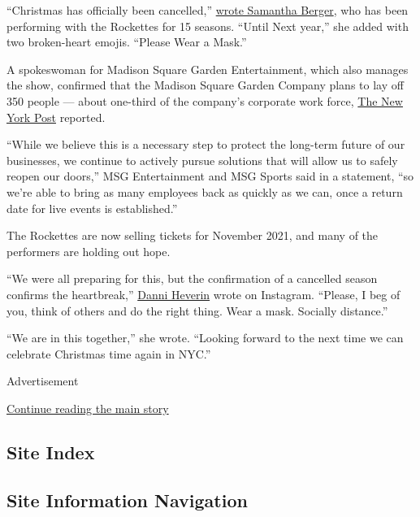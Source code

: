 ``Christmas has officially been cancelled,''
\href{https://www.instagram.com/p/CDeIBq_j0f0/?igshid=ejai6nxe4mff}{wrote
Samantha Berger}, who has been performing with the Rockettes for 15
seasons. ``Until Next year,'' she added with two broken-heart emojis.
``Please Wear a Mask.''

A spokeswoman for Madison Square Garden Entertainment, which also
manages the show, confirmed that the Madison Square Garden Company plans
to lay off 350 people --- about one-third of the company's corporate
work force,
\href{https://nypost.com/2020/08/04/radio-city-christmas-spectacular-canceled-for-first-time-ever/?utm_source=browser\&utm_medium=push-notification\&utm_campaign=radio-city-christmas-spectacular-canceled-for-first-time-ever}{The
New York Post} reported.

``While we believe this is a necessary step to protect the long-term
future of our businesses, we continue to actively pursue solutions that
will allow us to safely reopen our doors,'' MSG Entertainment and MSG
Sports said in a statement, ``so we're able to bring as many employees
back as quickly as we can, once a return date for live events is
established.''

The Rockettes are now selling tickets for November 2021, and many of the
performers are holding out hope.

``We were all preparing for this, but the confirmation of a cancelled
season confirms the heartbreak,''
\href{https://www.instagram.com/p/CDeFKMNhVPe/?igshid=v8q5sop9v4qz}{Danni
Heverin} wrote on Instagram. ``Please, I beg of you, think of others and
do the right thing. Wear a mask. Socially distance.''

``We are in this together,'' she wrote. ``Looking forward to the next
time we can celebrate Christmas time again in NYC.''

Advertisement

\protect\hyperlink{after-bottom}{Continue reading the main story}

\hypertarget{site-index}{%
\subsection{Site Index}\label{site-index}}

\hypertarget{site-information-navigation}{%
\subsection{Site Information
Navigation}\label{site-information-navigation}}

